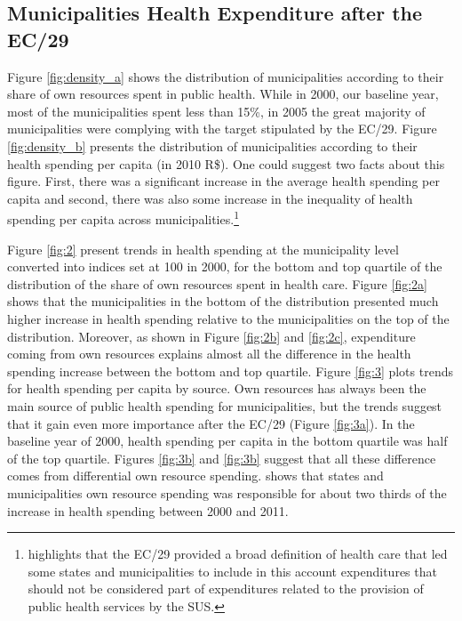 \subsection{Municipalities Health Expenditure after the EC/29}

Figure \ref{fig:density_a} shows the distribution of municipalities according to their share of own resources spent in public health. While in 2000, our baseline year, most of the municipalities spent less than 15\%, in 2005 the great majority of municipalities were complying with the target stipulated by the EC/29. Figure \ref{fig:density_b} presents the distribution of municipalities according to their health spending per capita (in 2010 R\$). One could suggest two facts about this figure. First, there was a significant increase in the average health spending per capita and second, there was also some increase in the inequality of health spending per capita across municipalities.\footnote{\cite{Piola2013} highlights that the EC/29 provided a broad definition of health care that led some states and municipalities to include in this account expenditures that should not be considered part of expenditures related to the provision of public health services by the SUS.}


Figure \ref{fig:2} present trends in health spending at the municipality level converted into indices set at 100 in 2000, for the bottom and top quartile of the distribution of the share of own resources spent in health care. Figure \ref{fig:2a} shows that the municipalities in the bottom of the distribution presented much higher increase in health spending relative to the municipalities on the top of the distribution. Moreover, as shown in Figure \ref{fig:2b} and \ref{fig:2c}, expenditure coming from own resources explains almost all the difference in the health spending increase between the bottom and top quartile. Figure \ref{fig:3} plots trends for health spending per capita by source. Own resources has always been the main source of public health spending for municipalities, but the trends suggest that it gain even more importance after the EC/29 (Figure \ref{fig:3a}). In the baseline year of 2000, health spending per capita in the bottom quartile was half of the top quartile. Figures \ref{fig:3b} and \ref{fig:3b} suggest that all these difference comes from differential own resource spending. \cite{Piola2013} shows that states and municipalities own resource spending was responsible for about two thirds of the increase in health spending between 2000 and 2011.


